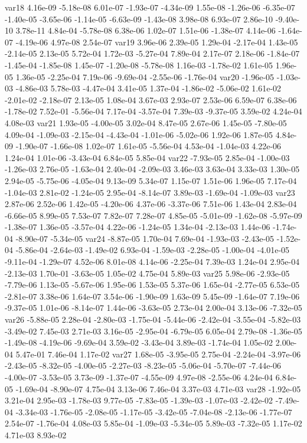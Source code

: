 var18  4.16e-09 -5.18e-08  6.01e-07 -1.93e-07 -4.34e-09  1.55e-08 -1.26e-06 -6.35e-07 -1.40e-05 -3.65e-06 -1.14e-05 -6.63e-09 -1.43e-08  3.98e-08  6.93e-07  2.86e-10 -9.40e-10  3.78e-11  4.84e-04 -5.78e-08  6.38e-06  1.02e-07  1.51e-06 -1.38e-07  4.14e-06 -1.64e-07 -4.19e-06  4.97e-08  2.54e-07
var19  3.96e-06  2.39e-05  1.29e-04 -2.17e-04  1.43e-05 -2.14e-05  2.13e-05  5.72e-04  1.72e-03 -5.27e-04  7.89e-04  2.17e-07  2.18e-06 -1.84e-07 -1.45e-04 -1.85e-08  1.45e-07 -1.20e-08 -5.78e-08  1.16e-03 -1.78e-02  1.61e-05  1.96e-05  1.36e-05 -2.25e-04  7.19e-06 -9.69e-04 -2.55e-06 -1.76e-04
var20 -1.96e-05 -1.03e-03 -4.86e-03  5.78e-03 -4.47e-04  3.41e-05  1.37e-04 -1.86e-02 -5.06e-02  1.61e-02 -2.01e-02 -2.18e-07  2.13e-05  1.08e-04  3.67e-03  2.93e-07  2.53e-06  6.59e-07  6.38e-06 -1.78e-02  7.52e-01 -5.56e-04  7.17e-04 -3.57e-04  7.39e-03 -9.37e-05  3.59e-02  4.24e-04  4.08e-03
var21  1.93e-05 -4.00e-05  3.02e-04  8.47e-05  2.67e-06  1.45e-05 -7.80e-05  4.09e-04 -1.09e-03 -2.15e-04 -4.43e-04 -1.01e-06 -5.02e-06  1.92e-06  1.87e-05  4.84e-09 -1.90e-07 -1.66e-08  1.02e-07  1.61e-05 -5.56e-04  4.53e-04 -1.04e-03  4.22e-06  1.24e-04  1.01e-06 -3.43e-04  6.84e-05  5.85e-04
var22 -7.93e-05  2.85e-04 -1.00e-03 -1.26e-03  2.76e-05 -1.63e-04  2.40e-04 -2.09e-03  3.46e-03  3.63e-04  3.33e-03  1.30e-05  2.94e-05 -5.75e-06 -4.05e-04  9.13e-09  5.34e-07  1.15e-07  1.51e-06  1.96e-05  7.17e-04 -1.04e-03  2.81e-02 -1.24e-05  2.95e-04 -8.14e-07  3.89e-03 -1.69e-04 -1.09e-03
var23  2.87e-06  2.52e-06  1.42e-05 -4.20e-06  4.37e-06 -3.37e-06  7.51e-06  1.43e-04  2.83e-04 -6.66e-05  8.99e-05  7.53e-07  7.82e-07  7.28e-07  4.85e-05 -5.01e-09 -1.62e-08 -5.97e-09 -1.38e-07  1.36e-05 -3.57e-04  4.22e-06 -1.24e-05  1.34e-04 -2.13e-03  1.44e-06 -1.74e-04 -8.90e-07 -5.34e-05
var24 -8.87e-05  1.70e-04  7.69e-04 -1.93e-03 -2.43e-05 -1.52e-04 -5.86e-04 -2.64e-03 -1.49e-02  6.93e-04 -1.59e-03 -2.28e-05 -1.00e-04 -4.01e-05 -9.11e-04 -1.29e-07  4.52e-06  8.01e-08  4.14e-06 -2.25e-04  7.39e-03  1.24e-04  2.95e-04 -2.13e-03  1.70e-01 -3.63e-05  1.05e-02  4.75e-04  5.89e-03
var25  5.98e-06 -2.93e-05 -7.79e-06  1.13e-05 -5.67e-06  1.95e-06  1.53e-05  5.37e-06  1.65e-04 -2.77e-05  6.53e-05 -2.81e-07  3.38e-06  1.64e-07  3.54e-06 -1.90e-09  1.63e-09  5.45e-09 -1.64e-07  7.19e-06 -9.37e-05  1.01e-06 -8.14e-07  1.44e-06 -3.63e-05  2.73e-04  2.00e-04  3.13e-06 -7.32e-05
var26 -5.88e-05  2.28e-04 -2.80e-03 -1.75e-04 -5.44e-06 -2.42e-04 -3.55e-04 -5.82e-03 -3.49e-02  7.45e-03  2.71e-03  3.16e-05 -2.95e-04 -6.79e-05  6.05e-04  2.79e-08 -1.36e-05 -1.49e-08 -4.19e-06 -9.69e-04  3.59e-02 -3.43e-04  3.89e-03 -1.74e-04  1.05e-02  2.00e-04  5.47e-01  7.46e-04  1.17e-02
var27  1.68e-05 -3.95e-05  2.75e-04 -2.24e-04 -3.97e-06 -2.43e-05 -8.32e-05 -4.00e-05 -2.27e-03 -8.23e-05 -5.06e-04 -5.70e-07 -7.44e-06 -4.00e-07 -3.53e-05  3.73e-09 -1.37e-07 -4.55e-09  4.97e-08 -2.55e-06  4.24e-04  6.84e-05 -1.69e-04 -8.90e-07  4.75e-04  3.13e-06  7.46e-04  3.37e-03  4.71e-03
var28 -1.92e-05  3.21e-04  2.95e-03 -1.78e-03  9.77e-05 -7.83e-05 -1.39e-03 -1.07e-03 -2.42e-02 -7.49e-04 -3.34e-03 -1.76e-05 -2.08e-05 -1.17e-05 -3.42e-05 -7.04e-08 -2.13e-06 -1.77e-07  2.54e-07 -1.76e-04  4.08e-03  5.85e-04 -1.09e-03 -5.34e-05  5.89e-03 -7.32e-05  1.17e-02  4.71e-03  8.93e-02




